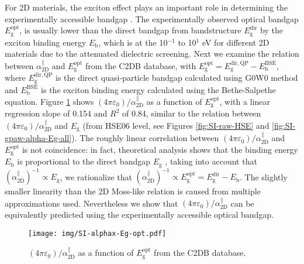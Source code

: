 \documentclass[manuscript=suppinfo,email=true,hyperref=true,keywords=false]{achemso}
\begin{document}
For 2D materials, the exciton effect plays an important role in
determining the experimentally accessible bandgap
\cite{Arnaud_2006_exc_hBN,Pulci_2014,Ramasubramaniam_2012,Chernikov_2014_EB_MoS2_2D3D}. The
experimentally observed optical bandgap
$E_{\mathrm{g}}^{\mathrm{opt}}$, is usually lower than the direct
bandgap from bandstructure $E_{\mathrm{g}}^{\mathrm{dir}}$ by the
exciton binding energy $E_{\mathrm{b}}$, which is at the 10$^{-1}$ to
10$^{1}$ eV for different 2D materials due to the attenuated
dielectric screening. Next we examine the relation between
$\alpha_{\mathrm{2D}}^{\parallel}$ and $E_{\mathrm{g}}^{\mathrm{opt}}$
from the C2DB database, with
$E_{\mathrm{g}}^{\mathrm{opt}}=E_{\mathrm{g}}^{\mathrm{dir,QP}}-E_{\mathrm{b}}^{\mathrm{BSE}}$,
where $E_{\mathrm{g}}^{\mathrm{dir,QP}}$ is the direct quasi-particle
bandgap calculated using G0W0 method and
$E_{\mathrm{b}}^{\mathrm{BSE}}$ is the exciton binding energy
calculated using the Bethe-Salpethe equation. Figure \ref{fig:opt}
shows $(4\pi\varepsilon_{0})/\alpha_{\mathrm{2D}}^{\parallel}$ as a
function of $E_{\mathrm{g}}^{\mathrm{opt}}$, with a linear regression
slope of 0.154 and $R^{2}$ of 0.84, similar to the relation between
$(4\pi \varepsilon_{0})/\alpha_{\mathrm{2D}}^{\parallel}$ and
$E_{\mathrm{g}}$ (from HSE06 level, see Figures \ref{fig:SI-raw-HSE}
and \ref{fig:SI-gpaw-alpha-Eg-all}). The roughly linear correlation
between $(4\pi \varepsilon_{0})/\alpha_{\mathrm{2D}}^{\parallel}$ and
$E_{\mathrm{g}}^{\mathrm{opt}}$ is not coincidence: in fact,
theoretical analysis shows that the binding energy $E_{\mathrm{b}}$ is
proportional to the direct bandgap $E_{\mathrm{g}}$
\cite{Jiang_2017_Eg_Eb}, taking into account that
$(\alpha_{\mathrm{2D}}^{\parallel})^{-1} \propto E_{\mathrm{g}}$, we
rationalize that
$(\alpha_{\mathrm{2D}}^{\parallel})^{-1} \propto
E_{\mathrm{g}}^{\mathrm{opt}}=E_{\mathrm{g}}^{\mathrm{dir}}-E_{\mathrm{b}}$. The
slightly smaller linearity than the 2D Moss-like relation is caused
from multiple approximations used. Nevertheless we show that
$(4\pi\varepsilon_{0})/\alpha_{\mathrm{2D}}^{\parallel}$ can be
equivalently predicted using the experimentally accessible optical
bandgap.

\begin{figure}[htbp]
  \centering
  \texttt{[image: img/SI-alphax-Eg-opt.pdf]}
  \caption{$(4\pi\varepsilon_{0})/\alpha_{\mathrm{2D}}^{\parallel}$ as a function of
    $E_{\mathrm{g}}^{\mathrm{opt}}$ from the C2DB database.}
  \label{fig:opt}
\end{figure}
\end{document}
